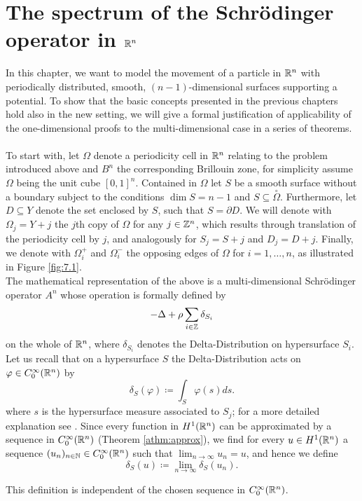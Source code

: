 \chapter{The spectrum of the Schrödinger operator in $\mathbb{R}^{n}$}  \label{chap:7} 

In this chapter, we want to model the movement of a particle in $\mathbb{R}^{n}$ with periodically distributed, smooth, $(n-1)$-dimensional surfaces supporting a potential. To show that the basic concepts presented in the previous chapters hold also in the new setting, we will give a formal justification of applicability of the one-dimensional proofs to the multi-dimensional case in a series of theorems.
~\\

To start with, let $\Omega$ denote a periodicity cell in $\mathbb{R}^{n}$ relating to the problem introduced above and $B^{n}$ the corresponding Brillouin zone, for simplicity assume $\Omega$ being the unit cube $[0, 1]^{n}$. Contained in $\Omega$ let $S$ be a smooth surface without a boundary subject to the conditions $\dim S = n - 1$ and $S \subseteq \overset{\circ}{\Omega}$. Furthermore, let $D \subseteq Y$ denote the set enclosed by $S$, such that $S = \partial D$. We will denote with $\Omega_{j} = Y + j$ the $j$th copy of $\Omega$ for any $j \in \mathbb{Z}^{n}$, which results through translation of the periodicity cell by $j$, and analogously for $S_{j} = S + j$ and $D_{j} = D + j$. Finally, we denote with $\Omega_{i}^{+}$ and $\Omega_{i}^{-}$ the opposing edges of $\Omega$ for $i = 1, \dotsc, n$, as illustrated in Figure \ref{fig:7.1}.
~\\

The mathematical representation of the above is a multi-dimensional Schrödinger operator $A^{n}$ whose operation is formally defined by
\begin{equation}
	- \Delta + \rho \sum_{i \in \mathbb{Z}} \delta_{S_{i}} \label{eq:7.1-md_the_operator_A_formallyy}
\end{equation}
on the whole of $\mathbb{R}^{n}$, where $\delta_{S_{i}}$ denotes the Delta-Distribution on hypersurface $S_{i}$. Let us recall that on a hypersurface $S$ the Delta-Distribution acts on $\varphi \in C_{0}^{\infty}(\mathbb{R}^{n})$ by 
	\[ \delta_{S}\left(\varphi\right) \coloneqq \int_{S} \varphi(s) ds . \]
where $s$ is the hypersurface measure associated to $S_{j}$; for a more detailed explanation see \cite[Chapter 14]{forster2012analysis}. Since every function in $H^{1}(\mathbb{R}^{n})$ can be approximated by a sequence in $C_{0}^{\infty}(\mathbb{R}^{n})$ (Theorem \ref{athm:approx}), we find for every $u \in H^{1}(\mathbb{R}^{n})$ a sequence $(u_{n})_{n \in \mathbb{N}} \in C_{0}^{\infty}(\mathbb{R}^{n})$ such that $\lim_{n \rightarrow \infty} u_{n} = u$, and hence we define
	\[ \delta_{S}\left(u\right) \coloneqq \lim_{n \rightarrow \infty} \delta_{S}\left(u_{n}\right) . \]
\begin{remark}
	This definition is independent of the chosen sequence in $C_{0}^{\infty}(\mathbb{R}^{n})$.
\end{remark}

